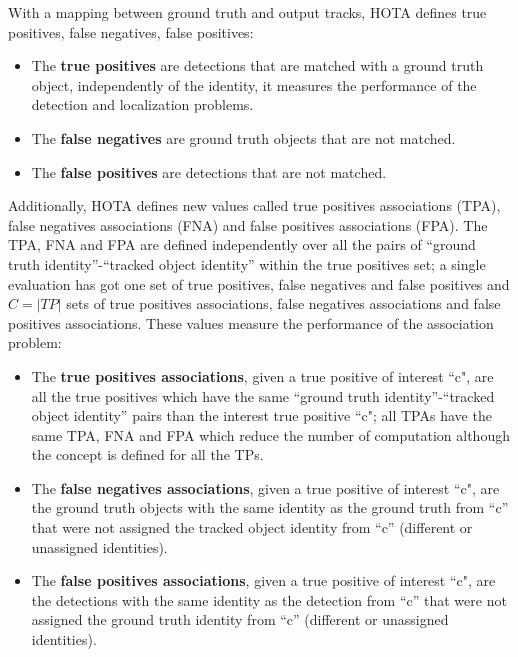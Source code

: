 {
    With a mapping between ground truth and output tracks, \ac{HOTA} defines true positives, false negatives, false positives:
}

\begin{itemize}
    \item The \textbf{true positives} are detections that are matched with a ground truth object, independently of the identity, it measures the performance of the detection and localization problems.
    \item The \textbf{false negatives} are ground truth objects that are not matched.
    \item The \textbf{false positives} are detections that are not matched.
\end{itemize}

{
    Additionally, \ac{HOTA} defines new values called true positives associations (\acs{TPA}), false negatives associations (\acs{FNA}) and false positives associations (\acs{FPA}).
    The \ac{TPA}, \ac{FNA} and \ac{FPA} are defined independently over all the pairs of ``ground truth identity''-``tracked object identity'' within the true positives set; a single evaluation has got one set of true positives, false negatives and false positives and $C=|TP|$ sets of true positives associations, false negatives associations and false positives associations. 
    These values measure the performance of the association problem:
}
\begin{samepage}
    \begin{itemize}
        \item The \textbf{true positives associations}, given a true positive of interest ``c", are all the true positives which have the same ``ground truth identity''-``tracked object identity'' pairs than the interest true positive ``c"; all \ac{TPA}s have the same \ac{TPA}, \ac{FNA} and \ac{FPA} which reduce the number of computation although the concept is defined for all the \ac{TP}s.
        \item The \textbf{false negatives associations}, given a true positive of interest ``c", are the ground truth objects with the same identity as the ground truth from ``c'' that were not assigned the tracked object identity from ``c'' (different or unassigned identities).
        \item The \textbf{false positives associations}, given a true positive of interest ``c", are the detections with the same identity as the detection from ``c'' that were not assigned the ground truth identity from ``c'' (different or unassigned identities).
    \end{itemize}
\end{samepage}

